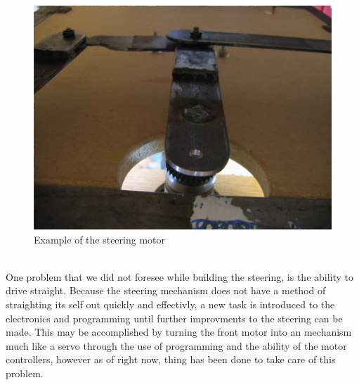 \documentclass{article}
\begin{document}
\begin{figure}[htp]
  \begin{center}
\includegraphics[scale=0.25]{steeringmotor}
  \end{center}
  \caption{Example of the steering motor}
\label{steeringmotor}
\end{figure}\\
One problem that we did not foresee while building the steering, is the ability to drive straight. Because the steering mechanism does not have a method of straighting its self out quickly and effectivly, a new task is introduced to the electronics and programming until further improvments to the steering can be made. This may be accomplished by turning the front motor into an mechanism much like a servo through the use of programming and the ability of the motor controllers, however as of right now, thing has been done to take care of this problem.\\
\end{document}
